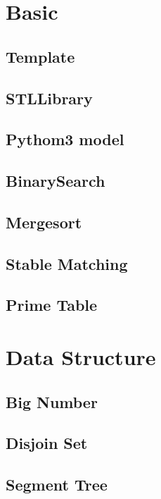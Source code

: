 \section{Basic}
\subsection{Template}

\subsection{STLLibrary}

\subsection{Pythom3 model}

\subsection{BinarySearch}

\subsection{Mergesort}

\subsection{Stable Matching}

\subsection{Prime Table}


\section{Data Structure}
\subsection{Big Number}

\subsection{Disjoin Set}

\subsection{Segment Tree}

